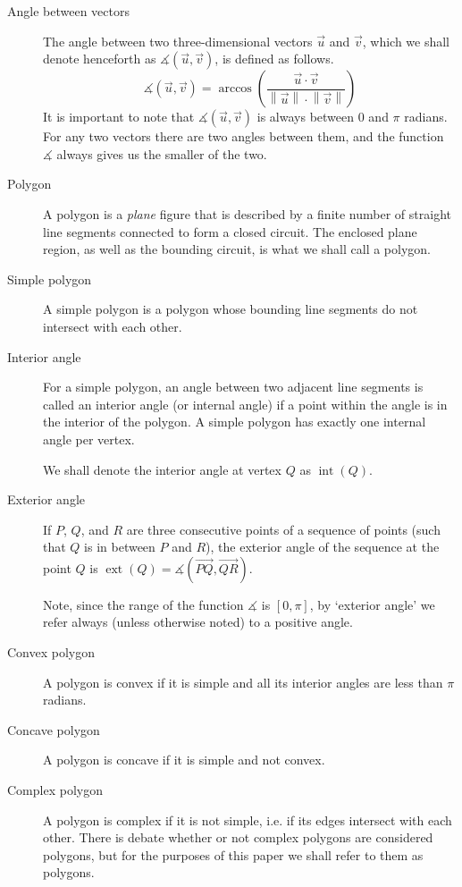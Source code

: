 \documentclass{article}
\newcommand{\vecl}{\overrightarrow} %
\newcommand{\ang}[1]{\measuredangle\left( #1 \right)}
\newcommand{\len}[1]{\left\lVert #1 \right\rVert}
\newcommand{\inta}[1]{\operatorname{int}\left( #1 \right)} %
\newcommand{\exta}[1]{\operatorname{ext}\left( #1 \right)} %
\begin{document}
\begin{description}
	\item[Angle between vectors]
		The angle between two three-dimensional vectors \(\vec{u}\) and \(\vec{v}\), which we shall denote henceforth as \(\ang{\vec{u}, \vec{v}}\), is defined as follows.
		\begin{equation*}
			\ang{\vec{u}, \vec{v}} = \arccos \left( \frac{\vec{u} \cdot \vec{v}} {\len{\vec{u}} \cdot \len{\vec{v}}} \right)
		\end{equation*}
		It is important to note that \(\ang{\vec{u}, \vec{v}}\) is always between 0 and \(\pi\) radians. For any two vectors there are two angles between them, and the function \(\measuredangle\) always gives us the smaller of the two.

	\item[Polygon]
		A polygon is a \emph{plane} figure that is described by a finite number of straight line segments connected to form a closed circuit. The enclosed plane region, as well as the bounding circuit, is what we shall call a polygon.

	\item[Simple polygon]
		A simple polygon is a polygon whose bounding line segments do not intersect with each other.

	\item[Interior angle]
		For a simple polygon, an angle between two adjacent line segments is called an interior angle (or internal angle) if a point within the angle is in the interior of the polygon. A simple polygon has exactly one internal angle per vertex.

		We shall denote the interior angle at vertex \(Q\) as \(\inta{Q}\).

	\item[Exterior angle]
		If \(P\), \(Q\), and \(R\) are three consecutive points of a sequence of points (such that \(Q\) is in between \(P\) and \(R\)), the exterior angle of the sequence at the point \(Q\) is \(\exta{Q} = \ang{\vecl{PQ}, \vecl{QR}}\).

		Note, since the range of the function \(\measuredangle\) is \([0, \pi]\), by `exterior angle' we refer always (unless otherwise noted) to a positive angle.

	\item[Convex polygon]
		A polygon is convex if it is simple and all its interior angles are less than \(\pi\) radians.

	\item[Concave polygon]
		A polygon is concave if it is simple and not convex.

	\item[Complex polygon]
		A polygon is complex if it is not simple, i.e. if its edges intersect with each other. There is debate whether or not complex polygons are considered polygons, but for the purposes of this paper we shall refer to them as polygons.
\end{description}
\end{document}
